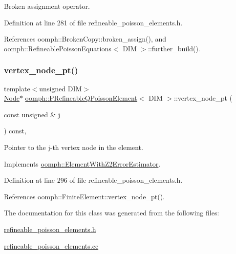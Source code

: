 Broken assignment operator. 



Definition at line 281 of file refineable\+\_\+poisson\+\_\+elements.\+h.



References oomph\+::\+Broken\+Copy\+::broken\+\_\+assign(), and oomph\+::\+Refineable\+Poisson\+Equations$<$ D\+I\+M $>$\+::further\+\_\+build().

\mbox{\label{classoomph_1_1PRefineableQPoissonElement_a37421434b215d1f0ee298c09839ed2ea}} 
\subsubsection{\texorpdfstring{vertex\+\_\+node\+\_\+pt()}{vertex\_node\_pt()}}
{\footnotesize\ttfamily template$<$unsigned D\+IM$>$ \\
\hyperlink{classoomph_1_1Node}{Node}$\ast$ \hyperlink{classoomph_1_1PRefineableQPoissonElement}{oomph\+::\+P\+Refineable\+Q\+Poisson\+Element}$<$ D\+IM $>$\+::vertex\+\_\+node\+\_\+pt (\begin{DoxyParamCaption}\item[{const unsigned \&}]{j }\end{DoxyParamCaption}) const\hspace{0.3cm}{\ttfamily [inline]}, {\ttfamily [virtual]}}



Pointer to the j-\/th vertex node in the element. 



Implements \hyperlink{classoomph_1_1ElementWithZ2ErrorEstimator_a0eedccc33519f852c5dc2055ddf2774b}{oomph\+::\+Element\+With\+Z2\+Error\+Estimator}.



Definition at line 296 of file refineable\+\_\+poisson\+\_\+elements.\+h.



References oomph\+::\+Finite\+Element\+::vertex\+\_\+node\+\_\+pt().



The documentation for this class was generated from the following files\+:\begin{DoxyCompactItemize}
\item 
\hyperlink{refineable__poisson__elements_8h}{refineable\+\_\+poisson\+\_\+elements.\+h}\item 
\hyperlink{refineable__poisson__elements_8cc}{refineable\+\_\+poisson\+\_\+elements.\+cc}\end{DoxyCompactItemize}
